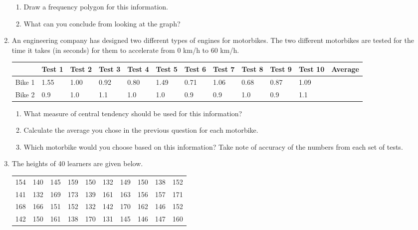 \documentclass[10pt,a4paper,titlepage,twoside,openright]{report}
\begin{document}
\begin{enumerate}
{\begin{enumerate}
    \item Draw a frequency polygon for this information.
    \item What can you conclude from looking at the graph?
    \end{enumerate}
}

\item{An engineering company has designed two different types of engines for motorbikes. The two different motorbikes are tested for the time it takes (in seconds) for them to accelerate from 0 km/h to 60 km/h.

\begin{tabular}{*{11}{|p{0.6cm}}|c|}
\hline
& Test 1 & Test 2 & Test 3 & Test 4 & Test 5 & Test 6 & Test 7 & Test 8 & Test 9 & Test 10 & Average\\
\hline
Bike 1 & 1.55 & 1.00 & 0.92 & 0.80 & 1.49 & 0.71 & 1.06 & 0.68 & 0.87 & 1.09 & \\
\hline
Bike 2 & 0.9 & 1.0 & 1.1 & 1.0 & 1.0 & 0.9 & 0.9 & 1.0 & 0.9 & 1.1 & \\
\hline
\end{tabular}
\begin{enumerate}
\item What measure of central tendency should be used for this information?
\item Calculate the average you chose in the previous question for each motorbike.
\item Which motorbike would you choose based on this information? Take note of accuracy of the numbers from each set of tests.
\end{enumerate}
}

\item{The heights of 40 learners are given below.
\begin{center}
\begin{tabular}{c c c c c c c c c c}
154 & 140 & 145 & 159 & 150 & 132 & 149 & 150 & 138 & 152 \\
141 & 132 & 169 & 173 & 139 & 161 & 163 & 156 & 157 & 171 \\
168 & 166 & 151 & 152 & 132 & 142 & 170 & 162 & 146 & 152 \\
142 & 150 & 161 & 138 & 170 & 131 & 145 & 146 & 147 & 160 \\

\end{tabular}
\end{center}

}
\end{enumerate}
\end{document}
